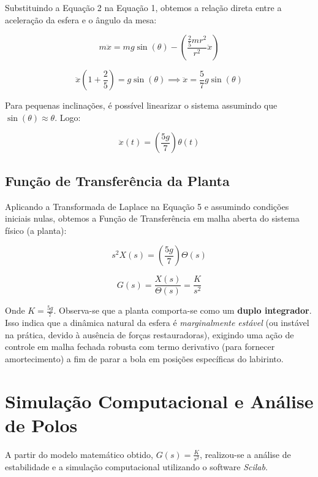 \documentclass[12pt]{article}
\begin{document}
Substituindo a Equação 2 na Equação 1, obtemos a relação direta entre a aceleração da esfera e o ângulo da mesa:

\begin{equation}
    m \ddot{x} = m g \sin(\theta) - \left( \frac{\frac{2}{5}mr^2}{r^2} \ddot{x} \right)
\end{equation}

\begin{equation}
    \ddot{x} \left( 1 + \frac{2}{5} \right) = g \sin(\theta) \implies \ddot{x} = \frac{5}{7} g \sin(\theta)
\end{equation}

Para pequenas inclinações, é possível linearizar o sistema assumindo que $\sin(\theta) \approx \theta$. Logo:

\begin{equation}
    \ddot{x}(t) = \left( \frac{5g}{7} \right) \theta(t)
\end{equation}

\subsection{Função de Transferência da Planta}
Aplicando a Transformada de Laplace na Equação 5 e assumindo condições iniciais nulas, obtemos a Função de Transferência em malha aberta do sistema físico (a planta):

\begin{equation}
    s^2 X(s) = \left( \frac{5g}{7} \right) \Theta(s)
\end{equation}

\begin{equation}
    G(s) = \frac{X(s)}{\Theta(s)} = \frac{K}{s^2}
\end{equation}

Onde $K = \frac{5g}{7}$. Observa-se que a planta comporta-se como um \textbf{duplo integrador}. Isso indica que a dinâmica natural da esfera é \textit{marginalmente estável} (ou instável na prática, devido à ausência de forças restauradoras), exigindo uma ação de controle em malha fechada robusta com termo derivativo (para fornecer amortecimento) a fim de parar a bola em posições específicas do labirinto.


\section{Simulação Computacional e Análise de Polos}

A partir do modelo matemático obtido, $G(s) = \frac{K}{s^2}$, realizou-se a análise de estabilidade e a simulação computacional utilizando o software \textit{Scilab}.
\end{document}
